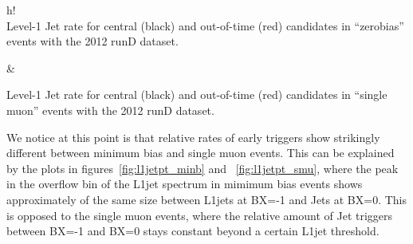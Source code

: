 \documentclass[11pt]{cmspaperpdf}
\begin{document}
\begin{2figures}{h!}
 \\
\caption{Level-1 Jet rate for central (black) and out-of-time (red) candidates in ``zerobias'' events with the 2012 runD dataset.}\label{fig:hbherate_minb} &
\caption{Level-1 Jet rate for central (black) and out-of-time (red) candidates in ``single muon'' events with the 2012 runD dataset.}\label{fig:hbherate_smu}
\end{2figures}

We notice at this point is that relative rates of early triggers show strikingly different between minimum bias and single muon events. This can be explained by the plots in figures~\ref{fig:l1jetpt_minb} and ~\ref{fig:l1jetpt_smu}, where the peak in the overflow bin of the L1jet spectrum in mimimum bias events shows approximately of the same size between L1jets at BX=-1 and Jets at BX=0. This is opposed to the single muon events, where the relative amount of Jet triggers between BX=-1 and BX=0 stays constant beyond a certain L1jet threshold.
\end{document}
